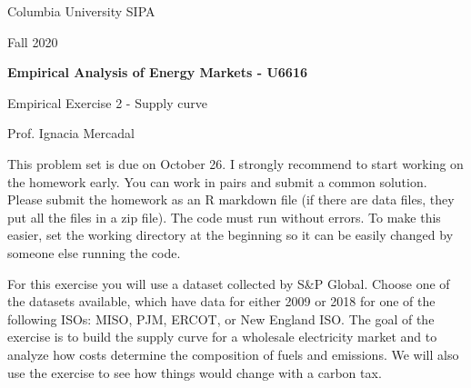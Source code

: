 \documentclass[11pt]{article}
\begin{document}
\begin{flushleft}
Columbia University SIPA	

Fall 2020

\end{flushleft}


\begin{center}
\textbf{Empirical Analysis of Energy Markets - U6616}

Empirical Exercise 2 - Supply curve

\end{center}

\begin{flushright}
Prof. Ignacia Mercadal	
\end{flushright}

This problem set is due on October 26. I strongly recommend to start working on the homework early. You can work in pairs and submit a common solution. Please submit the homework as an R markdown file (if there are data files, they put all the files in a zip file). The code must run without errors. To make this easier, set the working directory at the beginning so it can be easily changed by someone else running the code. 
 
 For this exercise you will use a dataset collected by S\&P Global. Choose one of the datasets available, which have data for either 2009 or 2018 for one of the following ISOs: MISO, PJM, ERCOT, or New England ISO.  The goal of the exercise is to build the supply curve for a wholesale electricity market and to analyze how costs determine the composition of fuels and emissions. We will also use the exercise to see how things would change with a carbon tax.
\end{document}

